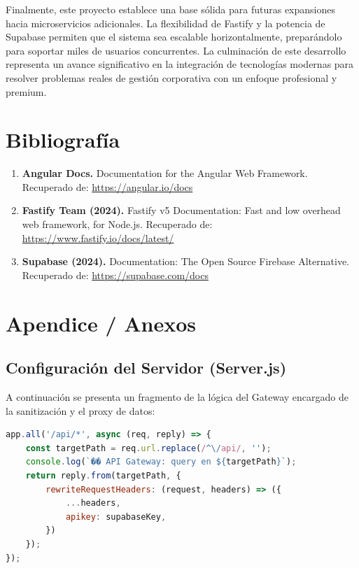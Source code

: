 \documentclass[12pt,a4paper]{article}
\begin{document}
Finalmente, este proyecto establece una base sólida para futuras expansiones hacia microservicios adicionales. La flexibilidad de Fastify y la potencia de Supabase permiten que el sistema sea escalable horizontalmente, preparándolo para soportar miles de usuarios concurrentes. La culminación de este desarrollo representa un avance significativo en la integración de tecnologías modernas para resolver problemas reales de gestión corporativa con un enfoque profesional y premium.

\newpage

\section{Bibliografía}
\begin{enumerate}
    \item \textbf{Angular Docs.} Documentation for the Angular Web Framework. Recuperado de: \url{https://angular.io/docs}
    \item \textbf{Fastify Team (2024).} Fastify v5 Documentation: Fast and low overhead web framework, for Node.js. Recuperado de: \url{https://www.fastify.io/docs/latest/}
    \item \textbf{Supabase (2024).} Documentation: The Open Source Firebase Alternative. Recuperado de: \url{https://supabase.com/docs}
\end{enumerate}

\newpage

\section{Apendice / Anexos}
\subsection{Configuración del Servidor (Server.js)}
A continuación se presenta un fragmento de la lógica del Gateway encargado de la sanitización y el proxy de datos:

\begin{lstlisting}[language=JavaScript, caption=Implementación de Proxy en Fastify]
app.all('/api/*', async (req, reply) => {
    const targetPath = req.url.replace(/^\/api/, '');
    console.log(`�� API Gateway: query en ${targetPath}`);
    return reply.from(targetPath, {
        rewriteRequestHeaders: (request, headers) => ({
            ...headers,
            apikey: supabaseKey,
        })
    });
});
\end{lstlisting}
\end{document}
